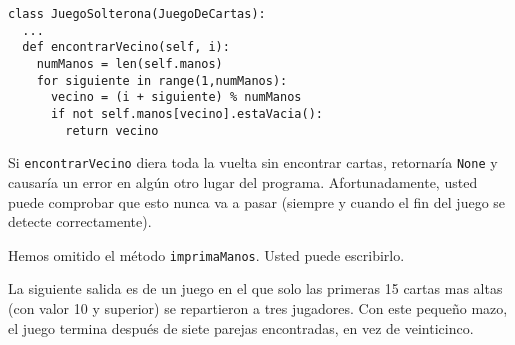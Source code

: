 \beforeverb
\begin{verbatim}
class JuegoSolterona(JuegoDeCartas):
  ...
  def encontrarVecino(self, i):
    numManos = len(self.manos)
    for siguiente in range(1,numManos):
      vecino = (i + siguiente) % numManos
      if not self.manos[vecino].estaVacia():
        return vecino
\end{verbatim}
\afterverb
%
Si  \texttt{encontrarVecino} diera toda la vuelta sin encontrar cartas,
retornaría  \texttt{None} y causaría un error en algún otro lugar del programa.
Afortunadamente, usted puede comprobar que esto nunca va a pasar (siempre y 
cuando el fin del juego se detecte correctamente).

Hemos omitido el método  \texttt{imprimaManos}. Usted puede escribirlo.

La siguiente salida es de un juego en el que solo las primeras 15 cartas
mas altas (con valor 10 y superior) se repartieron a tres jugadores. Con 
este pequeño mazo, el juego termina después de siete parejas encontradas,
en vez de veinticinco.

